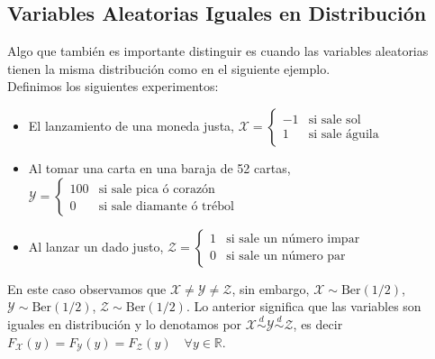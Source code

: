\subsection{Variables Aleatorias Iguales en Distribución}
Algo que también es importante distinguir es cuando las variables aleatorias tienen la misma distribución como en el siguiente ejemplo.\\
Definimos los siguientes experimentos:
\begin{itemize}
    \item El lanzamiento de una moneda justa, $\mathcal X=\begin{cases}
        -1 & \text{si sale sol}\\
        1 & \text{si sale águila}
    \end{cases}$

    \item Al tomar una carta en una baraja de 52 cartas, $\mathcal Y=\begin{cases}
        100 & \text{si sale pica ó corazón}\\
        0 & \text{si sale diamante ó trébol}
    \end{cases}$

    \item Al lanzar un dado justo, $\mathcal Z=\begin{cases}
        1 & \text{si sale un número impar}\\
        0 & \text{si sale un número par}
    \end{cases}$
\end{itemize}
En este caso observamos que $\mathcal X \neq \mathcal Y \neq \mathcal Z$, sin embargo, $\mathcal X \sim \text{Ber}(1/2)$, $\mathcal Y \sim \text{Ber}(1/2)$, $\mathcal Z \sim \text{Ber}(1/2)$. Lo anterior significa que las variables son iguales en distribución y lo denotamos por $\mathcal X \stackrel{d}{\sim} \mathcal Y \stackrel{d}{\sim} \mathcal Z$, es decir $F_{\mathcal X}(y)=F_{\mathcal Y}(y)=F_{\mathcal Z}(y) \quad \forall y \in \mathbb{R}$.



